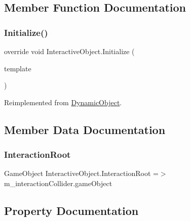 \subsection{Member Function Documentation}
\mbox{\label{class_interactive_object_a6337da87a5251d5eb65dccb7f1f76d16}} 
\subsubsection{\texorpdfstring{Initialize()}{Initialize()}}
{\footnotesize\ttfamily override void Interactive\+Object.\+Initialize (\begin{DoxyParamCaption}\item[{\mbox{\hyperlink{class_dynamic_object_template}{Dynamic\+Object\+Template}}}]{template }\end{DoxyParamCaption})\hspace{0.3cm}{\ttfamily [virtual]}}



Reimplemented from \mbox{\hyperlink{class_dynamic_object_a51dc678c061bc3a5eb60c3d96a1ef506}{Dynamic\+Object}}.



\subsection{Member Data Documentation}
\mbox{\label{class_interactive_object_ad4fa46cffeb6343827cac2e45324c443}} 
\subsubsection{\texorpdfstring{Interaction\+Root}{InteractionRoot}}
{\footnotesize\ttfamily Game\+Object Interactive\+Object.\+Interaction\+Root =$>$ m\+\_\+interaction\+Collider.\+game\+Object}



\subsection{Property Documentation}
\mbox{\label{class_interactive_object_a485ad8d7ce23aef73e8ed4845df0d2a5}} 
